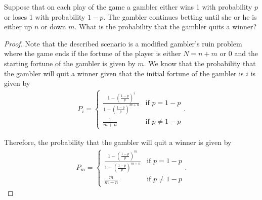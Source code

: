 \begin{problem}{4.56}
  Suppose that on each play of the game a gambler either wins 1 with probability $p$
  or loses 1 with probability $1 - p$. The gambler continues betting until she or
  he is either up $n$ or down $m$. What is the probability that the gambler quits a winner?
\end{problem}

\begin{proof}
  Note that the described scenario is a modified gambler's ruin problem where the game
  ends if the fortune of the player is either $N = n + m$ or $0$ and the starting fortune
  of the gambler is given by $m$. We know that the probability
  that the gambler will quit a winner given that the initial fortune of the gambler is $i$ is given by
  \begin{align*}
    P_i =
    \begin{cases}
      \displaystyle
      \frac{1 - \left(\frac{1-p}{p}\right)^i}{1 - \left(\frac{1-p}{p}\right)^{m+n}} & \text{if $p = 1 - p$} \\
      \frac{1}{m+n} & \text{if $p \neq 1- p$}
    \end{cases}.
  \end{align*}

  Therefore, the probability that the gambler will quit a winner is given by
  \begin{align*}
    P_m =
    \begin{cases}
      \displaystyle
      \frac{1 - \left(\frac{1-p}{p}\right)^m}{1 - \left(\frac{1-p}{p}\right)^{m+n}} & \text{if $p = 1 - p$} \\
      \frac{m}{m+n} & \text{if $p \neq 1- p$}
    \end{cases}.
  \end{align*}
\end{proof}
\newpage
